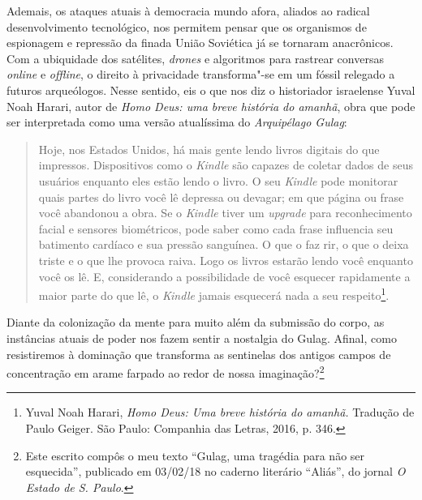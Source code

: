 Ademais, os ataques atuais à democracia mundo afora, aliados ao radical
desenvolvimento tecnológico, nos permitem pensar que os organismos de
espionagem e repressão da finada União Soviética já se tornaram
anacrônicos. Com a ubiquidade dos satélites, \emph{drones} e algoritmos
para rastrear conversas \emph{online} e \emph{offline}, o direito à
privacidade transforma"-se em um fóssil relegado a futuros arqueólogos.
Nesse sentido, eis o que nos diz o historiador israelense Yuval Noah
Harari, autor de \emph{Homo Deus: uma breve história do amanhã}, obra
que pode ser interpretada como uma versão atualíssima do
\emph{Arquipélago Gulag}:

\begin{quote}
Hoje, nos Estados Unidos, há mais gente lendo livros digitais do que
impressos. Dispositivos como o \emph{Kindle} são capazes de coletar
dados de seus usuários enquanto eles estão lendo o livro. O seu
\emph{Kindle} pode monitorar quais partes do livro você lê depressa ou
devagar; em que página ou frase você abandonou a obra. Se o
\emph{Kindle} tiver um \emph{upgrade} para reconhecimento facial e
sensores biométricos, pode saber como cada frase influencia seu
batimento cardíaco e sua pressão sanguínea. O que o faz rir, o que o
deixa triste e o que lhe provoca raiva. Logo os livros estarão lendo
você enquanto você os lê. E, considerando a possibilidade de você
esquecer rapidamente a maior parte do que lê, o \emph{Kindle} jamais
esquecerá nada a seu respeito\footnote{Yuval Noah Harari, \emph{Homo
  Deus: Uma breve história do amanhã.} Tradução de Paulo Geiger. São
  Paulo: Companhia das Letras, 2016, p. 346.}.
\end{quote}

Diante da colonização da mente para muito além da submissão do corpo, as
instâncias atuais de poder nos fazem sentir a nostalgia do Gulag.
Afinal, como resistiremos à dominação que transforma as sentinelas dos
antigos campos de concentração em arame farpado ao redor de nossa
imaginação?\footnote{Este escrito compôs o meu texto ``Gulag, uma
  tragédia para não ser esquecida'', publicado em 03/02/18 no caderno
  literário ``Aliás'', do jornal \emph{O Estado de S. Paulo}.}

\pagebreak
\clearpage
\thispagestyle{empty}

